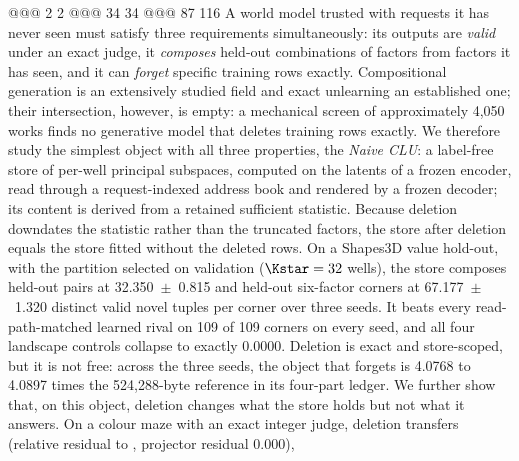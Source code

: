 @@@ 2 2
@@@ 34 34
@@@ 87 116
A world model trusted with requests it has never seen must satisfy three requirements
simultaneously: its outputs are \emph{valid} under an exact judge, it \emph{composes}
held-out combinations of factors from factors it has seen, and it can \emph{forget} specific
training rows exactly. Compositional generation is an extensively studied field and exact
unlearning an established one; their intersection, however, is empty: a mechanical
screen of approximately 4,050 works finds no generative model that deletes training rows
exactly. %
We therefore study the simplest object with all three properties, the \emph{Naive CLU}: a
label-free store of per-well principal subspaces, computed on the latents of a frozen
encoder, read through a request-indexed address book and rendered by a frozen decoder; its
content is derived from a retained sufficient statistic. Because deletion downdates the
statistic rather than the truncated factors, the store after deletion equals the store fitted
without the deleted rows.
On a Shapes3D value hold-out, with the partition selected on validation ($\Kstar=32$ wells),
the store composes held-out pairs at 32.350~$\pm$~0.815 and held-out six-factor corners at
67.177~$\pm$~1.320 distinct valid novel tuples per corner over three seeds. It beats every
read-path-matched learned rival on 109 of 109 corners on every seed, and all four landscape
controls collapse to exactly 0.0000. %
Deletion is exact and store-scoped, but it is not free: across the three seeds, the object
that forgets is 4.0768 to 4.0897 times the 524,288-byte reference in its four-part ledger. We
further show that, on this object, deletion changes what the store holds but not what it answers.
On a colour maze with an exact integer judge, deletion transfers
(relative residual  to , projector residual 0.000), %
